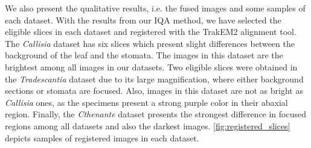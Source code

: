 We also present the qualitative results, i.e. the fused images and some samples of each dataset. With the results from our IQA method, we have selected the eligible slices in each dataset and registered with the TrakEM2 alignment tool. The \textit{Callisia} dataset has six slices which present slight differences between the background of the leaf and the stomata. The images in this dataset are the brightest among all images in our datasets. Two eligible slices were obtained in the \textit{Tradescantia} dataset due to its large magnification, where either background sections or stomata are focused. Also, images in this dataset are not as bright as \textit{Callisia} ones, as the specimens present a strong purple color in their abaxial region. Finally, the \textit{Cthenante} dataset presents the strongest difference in focused regions among all datasets and also the darkest images. \autoref{fig:registered_slices} depicts samples of registered images in each dataset. 

